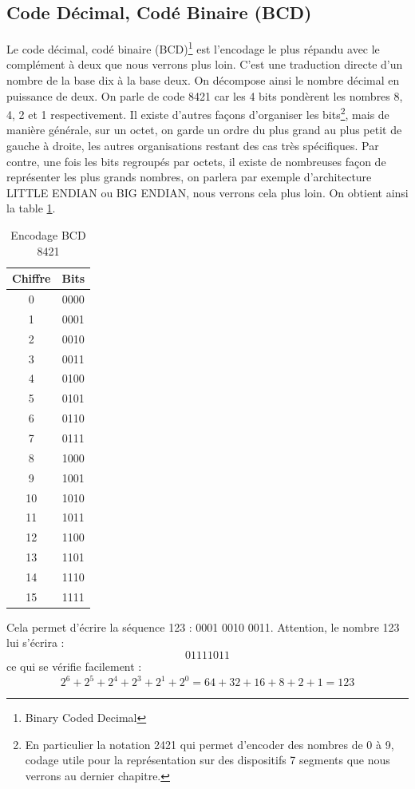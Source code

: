 \documentclass[a4paper,11pt]{book}
\theoremstyle{definition}
\begin{document}
\subsection{Code Décimal, Codé Binaire (BCD)}
Le code décimal, codé binaire (BCD)\footnote{Binary Coded Decimal} est l'encodage le plus répandu avec le complément à deux que nous verrons plus loin. C'est une traduction directe d'un nombre de la base dix à la base deux. On décompose ainsi le nombre décimal en puissance de deux. On parle de code 8421 car les 4 bits pondèrent les nombres 8, 4, 2 et 1 respectivement. Il existe d'autres façons d'organiser les bits\footnote{En particulier la notation 2421 qui permet d'encoder des nombres de 0 à 9, codage utile pour la représentation sur des dispositifs 7 segments que nous verrons au dernier chapitre.}, mais de manière générale, sur un octet, on garde un ordre du plus grand au plus petit de gauche à droite, les autres organisations restant des cas très spécifiques. Par contre, une fois les bits regroupés par octets, il existe de nombreuses façon de représenter les plus grands nombres, on parlera par exemple d'architecture LITTLE ENDIAN ou BIG ENDIAN, nous verrons cela plus loin.
On obtient ainsi la table \ref{table:codeBCD}.
\begin{table}[h!]
\centering
\begin{tabular}{ |c|c| } 
 \hline
 Chiffre & Bits  \\ 
 \hline
 0 & 0000  \\ 
 1 & 0001  \\ 
 2 & 0010  \\ 
 3 & 0011  \\ 
 4 & 0100  \\ 
 5 & 0101  \\ 
 6 & 0110  \\ 
 7 & 0111  \\ 
 8 & 1000  \\ 
 9 & 1001  \\ 
 10 & 1010  \\ 
 11 & 1011  \\ 
 12 & 1100  \\ 
 13 & 1101  \\ 
 14 & 1110  \\ 
 15 & 1111  \\ 
 \hline
\end{tabular}
\caption{Encodage BCD 8421}
\label{table:codeBCD}
\end{table}


Cela permet d’écrire la séquence 123 : 0001 0010 0011. Attention, le nombre 123 lui s'écrira : \[0111 1011\] ce qui se vérifie facilement : \[2^6 + 2^5 + 2^4 + 2^3 + 2^1 + 2^0 = 64 + 32 + 16 + 8 + 2 + 1 = 123 \]
\end{document}
